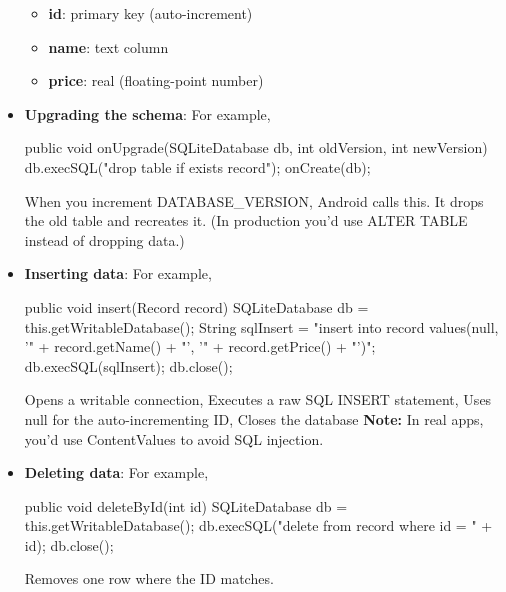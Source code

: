 \documentclass{report}
\begin{document}
\begin{itemize}
            \begin{itemize}
                \item \textbf{id}: primary key (auto-increment)
                \item \textbf{name}: text column
                \item \textbf{price}: real (floating-point number)
            \end{itemize}
        \item \textbf{Upgrading the schema}: For example, 
            \bigbreak \noindent 
            \begin{javacode}
                public void onUpgrade(SQLiteDatabase db, int oldVersion, int newVersion) {
                    db.execSQL("drop table if exists record");
                    onCreate(db);
                }
            \end{javacode}
            \bigbreak \noindent 
            When you increment DATABASE\_VERSION, Android calls this. It drops the old table and recreates it. (In production you’d use ALTER TABLE instead of dropping data.)
        \item \textbf{Inserting data}: For example, 
            \bigbreak \noindent 
            \begin{javacode}
                public void insert(Record record) {
                    SQLiteDatabase db = this.getWritableDatabase();
                    String sqlInsert = "insert into record values(null, '" +
                                        record.getName() + "', '" + record.getPrice() + "')";
                    db.execSQL(sqlInsert);
                    db.close();
                }
            \end{javacode}
            \bigbreak \noindent 
            Opens a writable connection, Executes a raw SQL INSERT statement, Uses null for the auto-incrementing ID, Closes the database
            \bigbreak \noindent 
            \textbf{Note:} In real apps, you’d use ContentValues to avoid SQL injection.
        \item \textbf{Deleting data}: For example,
            \bigbreak \noindent 
            \begin{javacode}
                public void deleteById(int id) {
                    SQLiteDatabase db = this.getWritableDatabase();
                    db.execSQL("delete from record where id = " + id);
                    db.close();
                }
            \end{javacode}
            \bigbreak \noindent 
            Removes one row where the ID matches.

\end{itemize}
\end{document}
